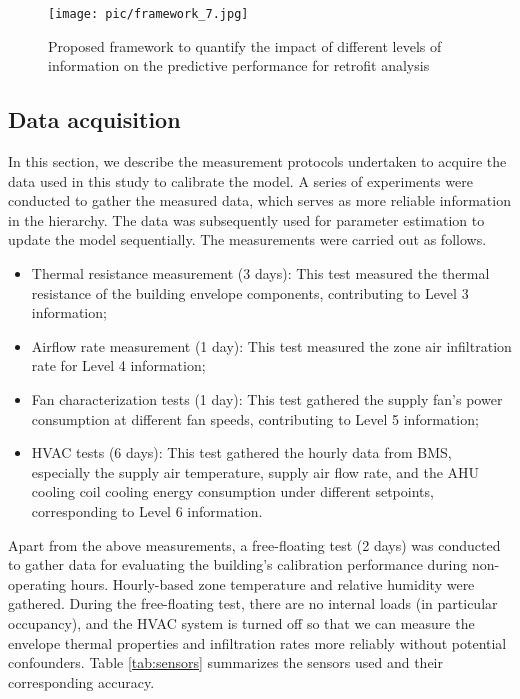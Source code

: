 \documentclass[3p,times,12pt]{elsarticle}
\begin{document}
\begin{sloppypar}
\begin{figure}[H]
\centering\texttt{[image: pic/framework\_7.jpg]}
\caption{Proposed framework to quantify the impact of different levels of information on the predictive performance for retrofit analysis}
\label{fig:framework}
\end{figure}

\subsection{Data acquisition}
\label{S:2.2}
In this section, we describe the measurement protocols undertaken to acquire the data used in this study to calibrate the model. A series of experiments were conducted to gather the measured data, which serves as more reliable information in the hierarchy. The data was subsequently used for parameter estimation to update the model sequentially. The measurements were carried out as follows. 

\begin{itemize}
\item Thermal resistance measurement (3 days): This test measured the thermal resistance of the building envelope components, contributing to Level 3 information;
\item Airflow rate measurement (1 day): This test measured the zone air infiltration rate for Level 4 information;
\item Fan characterization tests (1 day): This test gathered the supply fan's power consumption at different fan speeds, contributing to Level 5 information;
\item HVAC tests (6 days): This test gathered the hourly data from BMS, especially the supply air temperature, supply air flow rate, and the AHU cooling coil cooling energy consumption under different setpoints, corresponding to Level 6 information. 
\end{itemize}

Apart from the above measurements, a free-floating test (2 days) was conducted to gather data for evaluating the building's calibration performance during non-operating hours. Hourly-based zone temperature and relative humidity were gathered. During the free-floating test, there are no internal loads (in particular occupancy), and the HVAC system is turned off so that we can measure the envelope thermal properties and infiltration rates more reliably without potential confounders. Table \ref{tab:sensors} summarizes the sensors used and their corresponding accuracy. 


\end{sloppypar}
\end{document}

